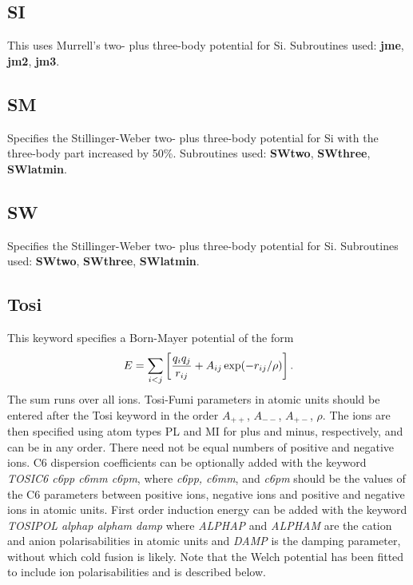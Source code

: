 \documentclass[12pt,a4paper,dvips]{article}
\begin{document}
\subsection{SI}This uses Murrell's two- plus three-body potential for Si\cite{lijm92}.
Subroutines used: {\bf jme}, {\bf jm2}, {\bf jm3}.

\subsection{SM} Specifies the Stillinger-Weber two- plus three-body potential for Si\cite{stillingerw85}
with the three-body part increased by 50\%.
Subroutines used: {\bf SWtwo}, {\bf SWthree}, {\bf SWlatmin}.

\subsection{SW} Specifies the Stillinger-Weber two- plus three-body potential for Si\cite{stillingerw85}.
Subroutines used: {\bf SWtwo}, {\bf SWthree}, {\bf SWlatmin}.

\subsection{Tosi}This keyword specifies a Born-Mayer potential of the form
$$ E = \sum_{i<j}\left[ {q_i q_j\over r_{ij}} + A_{ij}\exp(-r_{ij}/\rho) \right]. $$
The sum runs over all ions. Tosi-Fumi\cite{tosif64} parameters in atomic units should be
entered after the Tosi keyword in the order $A_{++}$, $A_{--}$, $A_{+-}$, $\rho$.
The ions are then specified using atom types PL and MI for plus and minus, respectively,
and can be in any order. There need not be equal numbers of positive and negative ions.
C6 dispersion coefficients can be optionally added with the keyword {\it TOSIC6 c6pp c6mm c6pm\/},
where {\it c6pp, c6mm\/}, and  {\it c6pm\/} should be the values of the C6 parameters between positive ions,
negative ions and positive and negative ions in atomic units. First order induction energy
can be added with the keyword {\it TOSIPOL alphap alpham damp\/} where {\it ALPHAP\/} and
{\it ALPHAM \/} are the cation and anion polarisabilities in atomic units and {\it DAMP\/}
is the damping parameter, without which cold fusion is likely. Note that the Welch potential
has been fitted to include ion polarisabilities and is described below.

\end{document}
